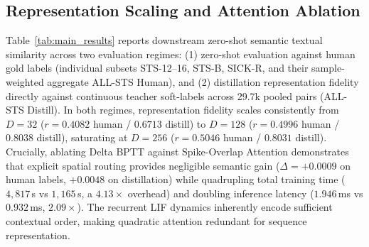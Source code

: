 \documentclass[runningheads]{llncs}
\begin{document}
\subsection{Representation Scaling and Attention Ablation}
Table~\ref{tab:main_results} reports downstream zero-shot semantic textual similarity across two evaluation regimes: (1) zero-shot evaluation against human gold labels (individual subsets STS-12--16, STS-B, SICK-R, and their sample-weighted aggregate ALL-STS Human), and (2) distillation representation fidelity directly against continuous teacher soft-labels across 29.7k pooled pairs (ALL-STS Distill). In both regimes, representation fidelity scales consistently from $D=32$ ($r=0.4082$ human / $0.6713$ distill) to $D=128$ ($r=0.4996$ human / $0.8038$ distill), saturating at $D=256$ ($r=0.5046$ human / $0.8031$ distill). Crucially, ablating Delta BPTT against Spike-Overlap Attention demonstrates that explicit spatial routing provides negligible semantic gain ($\Delta = +0.0009$ on human labels, $+0.0048$ on distillation) while quadrupling total training time ($4{,}817$\,s vs $1{,}165$\,s, a $\mathbf{4.13\times}$ overhead) and doubling inference latency ($1.946$\,ms vs $0.932$\,ms, $\mathbf{2.09\times}$). The recurrent LIF dynamics inherently encode sufficient contextual order, making quadratic attention redundant for sequence representation.

\begin{table}[t]
\caption{Comparison with published sentence embedding baselines on STS-B. Reported as Pearson $r$ for Delta BPTT and static baselines; Spearman $\rho$ for published Transformer and SNN models ($^\dagger$\cite{bal2024spikingbert}, $^\ddagger$\cite{zhou2025spikingformer}, $^\star$\cite{sanh2019distilbert}).}\label{tab:external_baselines}
\centering
{}
\end{table}
\end{document}
